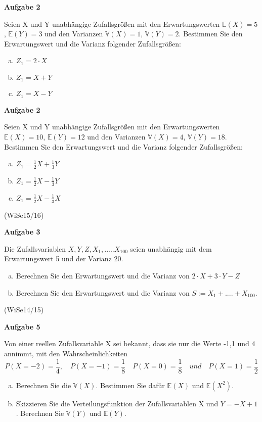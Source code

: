 \documentclass[a4paper,12pt]{article}
\newcommand{\Aufgabe}[1]{
  {
  \vspace*{0.5cm}
  \textsf{\textbf{Aufgabe #1}}
  \vspace*{0.2cm}
  
  }
}
\begin{document}
\Aufgabe{2}
Seien X und Y unabhängige Zufallsgrößen mit den Erwartungswerten $\mathbb{E}(X) = 5$, $\mathbb{E}(Y) = 3$ und den Varianzen $\mathbb{V}(X) =1$, $\mathbb{V}(Y) =2$.
Bestimmen Sie den Erwartungswert und die Varianz folgender Zufallsgrößen:
\begin{enumerate}[a)]
\item
$Z_1 =  2\cdot X $
\item
$Z_1 =  X + Y$
\item
$Z_1 =  X -  Y$
\end{enumerate} 

\Aufgabe{2}
Seien X und Y unabhängige Zufallsgrößen mit den Erwartungswerten $\mathbb{E}(X) = 10$, $\mathbb{E}(Y) = 12$ und den Varianzen $\mathbb{V}(X) =4$, $\mathbb{V}(Y) =18$.
Bestimmen Sie den Erwartungswert und die Varianz folgender Zufallsgrößen:
\begin{enumerate}[a)]
\item
$Z_1 = \frac{1}{2} X + \frac{1}{3} Y$
\item
$Z_1 = \frac{1}{2} X - \frac{1}{3} Y$
\item
$Z_1 = \frac{1}{2} X - \frac{1}{3} X$
\end{enumerate} 
(WiSe15/16)

\Aufgabe{3}
Die Zufallsvariablen $X, Y, Z, X_1, ..... X_{100}$ seien unabhängig mit dem Erwartungswert 5 und der Varianz 20.
\begin{enumerate}[a)]
\item
Berechnen Sie den Erwartungswert und die Varianz von $2\cdot X + 3 \cdot Y - Z$
\item 
Berechnen Sie den Erwartungswert und die Varianz von $S:=X_1 + .... + X_{100}$.
\end{enumerate} 
(WiSe14/15)

\Aufgabe{5}
Von einer reellen Zufallsvariable X sei bekannt, dass sie nur die Werte -1,1 und 4 annimmt, mit den Wahrscheinlichkeiten
$$ P(X=-2) = \frac{1}{4}, \quad P(X = -1) = \frac{1}{8}  \quad P(X = 0) = \frac{1}{8} \quad und \quad P(X=1)=\frac{1}{2} $$
\begin{enumerate}[a)]
\item Berechnen Sie die $\mathbb{V}(X)$. Bestimmen Sie dafür $\mathbb{E}(X)$ und $\mathbb{E}(X^2)$.
\item Skizzieren Sie die Verteilungsfunktion der Zufallsvariablen X und $ Y = -X + 1 $. Berechnen Sie $\mathbb{V}(Y)$ und $\mathbb{E}(Y)$.
\end{enumerate} 
\end{document}
